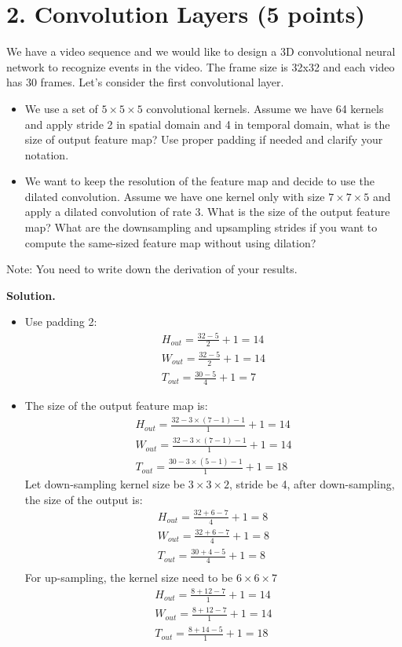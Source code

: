 \documentclass[12pt]{article}%
\begin{document}
	
	
	
	\newpage
	\section*{2. Convolution Layers (5 points)}
	We have a video sequence and we would like to design a 3D convolutional neural network to recognize events in the video. The frame size is 32x32 and each video has 30 frames. Let's consider the first convolutional layer.  
	\begin{itemize}
		\item We use a set of $5\times 5\times 5$ convolutional kernels. Assume we have 64 kernels and apply stride 2 in spatial domain and 4 in temporal domain, what is the size of output feature map? Use proper padding if needed and clarify your notation.
		\item We want to keep the resolution of the feature map and decide to use the dilated convolution. Assume we have one kernel only with size $7\times 7\times 5$ and apply a dilated convolution of rate $3$. What is the size of the output feature map? What are the downsampling and upsampling strides if you want to compute the same-sized feature map without using dilation?   
	\end{itemize}
	Note: You need to write down the derivation of your results.
	
	\textbf{Solution.}
	
	\begin{itemize}
		\item Use padding 2:
		\begin{align*}
			H_{out} = \frac{32 - 5}{2} + 1 = 14 \\
			W_{out} = \frac{32 - 5}{2} + 1 = 14 \\
			T_{out} = \frac{30 - 5}{4} + 1 = 7 
		\end{align*}
		\item The size of the output feature map is:
		\begin{align*}
			H_{out} = \frac{32 - 3 \times (7-1) -1}{1} + 1 = 14 \\
			W_{out} = \frac{32 - 3 \times (7-1) -1}{1} + 1 = 14 \\
			T_{out} = \frac{30 - 3 \times (5-1) -1}{1} + 1 = 18
		\end{align*}
		Let down-sampling kernel size be $3\times3\times2$, stride be 4, after down-sampling, the size of the output is:
		\begin{align*}
			H_{out} = \frac{32 + 6 - 7}{4} + 1 = 8 \\
			W_{out} = \frac{32 + 6 - 7}{4} + 1 = 8 \\
			T_{out} = \frac{30 + 4 - 5}{4} + 1 = 8 \\
		\end{align*}
		For up-sampling, the kernel size need to be $6\times6\times7$
		\begin{align*}
			H_{out} = \frac{8 + 12 - 7}{1} + 1 = 14 \\
			W_{out} = \frac{8 + 12 - 7}{1} + 1 = 14 \\
			T_{out} = \frac{8 + 14 - 5}{1} + 1 = 18 \\
		\end{align*}
	\end{itemize}
	
\end{document}
